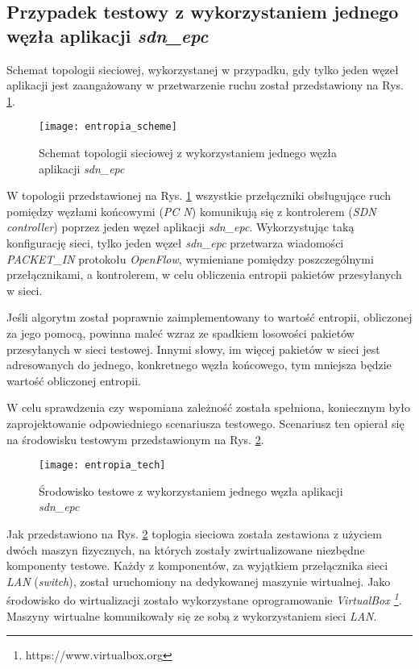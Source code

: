 \subsection{Przypadek testowy z wykorzystaniem jednego węzła aplikacji
  \textit{sdn\_epc}} \label{entropy_one_node}

Schemat topologii sieciowej, wykorzystanej w przypadku, gdy tylko jeden węzeł
aplikacji jest zaangażowany w przetwarzenie ruchu został przedstawiony na
Rys. \ref{fig:entropia_scheme}.

\begin{figure}[h]
\centering
\texttt{[image: entropia\_scheme]}
\caption{Schemat topologii sieciowej z wykorzystaniem jednego węzła aplikacji
  \textit{sdn\_epc}}
\label{fig:entropia_scheme}
\end{figure}

W topologii przedstawionej na Rys. \ref{fig:entropia_scheme} wszystkie
przełączniki obsługujące ruch pomiędzy węzłami końcowymi (\textit{PC N})
komunikują się z kontrolerem (\textit{SDN controller}) poprzez jeden węzeł
aplikacji \textit{sdn\_epc}. Wykorzystując taką konfigurację sieci, tylko jeden
węzeł \textit{sdn\_epc} przetwarza wiadomości \mbox{\textit{PACKET\_IN}}
protokołu \textit{OpenFlow}, wymieniane pomiędzy poszczególnymi przełącznikami,
a kontrolerem, w celu obliczenia entropii pakietów przesyłanych w sieci.

Jeśli algorytm został poprawnie zaimplementowany to wartość entropii,
obliczonej za jego pomocą, powinna maleć wzraz ze spadkiem losowości pakietów
przesyłanych w sieci testowej. Innymi słowy, im więcej pakietów w sieci jest
adresowanych do jednego, konkretnego węzła końcowego, tym mniejsza będzie wartość
obliczonej entropii.

W celu sprawdzenia czy wspomiana zależność została spełniona, koniecznym było
zaprojektowanie odpowiedniego scenariusza testowego. Scenariusz ten opierał się
na środowisku testowym przedstawionym na Rys. \ref{fig:entropia_tech}.

\begin{figure}[h]
\centering
\texttt{[image: entropia\_tech]}
\caption{Środowisko testowe z wykorzystaniem jednego węzła aplikacji
  \textit{sdn\_epc}}
\label{fig:entropia_tech}
\end{figure}

Jak przedstawiono na Rys. \ref{fig:entropia_tech} toplogia sieciowa została
zestawiona z użyciem dwóch maszyn fizycznych, na których zostały zwirtualizowane
niezbędne komponenty testowe. Każdy z komponentów, za wyjątkiem przełącznika
sieci \textit{LAN} (\textit{switch}), został uruchomiony na dedykowanej maszynie
wirtualnej. Jako środowisko do wirtualizacji zostało wykorzystane oprogramowanie
\textit{VirtualBox \footnote{https://www.virtualbox.org}}. Maszyny wirtualne
komunikowały się ze sobą z wykorzystaniem sieci \textit{LAN}.

